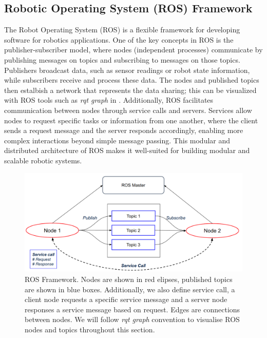 \subsection{Robotic Operating System (ROS) Framework}
The Robot Operating System (ROS) is a flexible framework for developing software for robotics applications. One of the key concepts in ROS is the publisher-subscriber model, where nodes (independent processes) communicate by publishing messages on topics and subscribing to messages on those topics. Publishers broadcast data, such as sensor readings or robot state information, while subscribers receive and process these data. The nodes and published topics then estalbish a network that represents the data sharing; this can be visualized with ROS tools such as \emph{rqt graph} in . Additionally, ROS facilitates communication between nodes through service calls and servers. Services allow nodes to request specific tasks or information from one another, where the client sends a request message and the server responds accordingly, enabling more complex interactions beyond simple message passing. This modular and distributed architecture of ROS makes it well-suited for building modular and scalable robotic systems. 
\begin{figure}[t]
  \centering
  \includegraphics[width=0.8\columnwidth]{pics/Implementation_ros_framework2.png}
  \caption{ROS Framework. Nodes are shown in red elipses, published topics are shown in blue boxes. Additionally, we also define service call, a client node requests a specific service message and a server node responses a service message based on request. Edges are connections between nodes. We will follow \emph{rqt graph} convention to visualise ROS nodes and topics throughout this section.}
  \label{fig:implementation_ros}
\end{figure}

